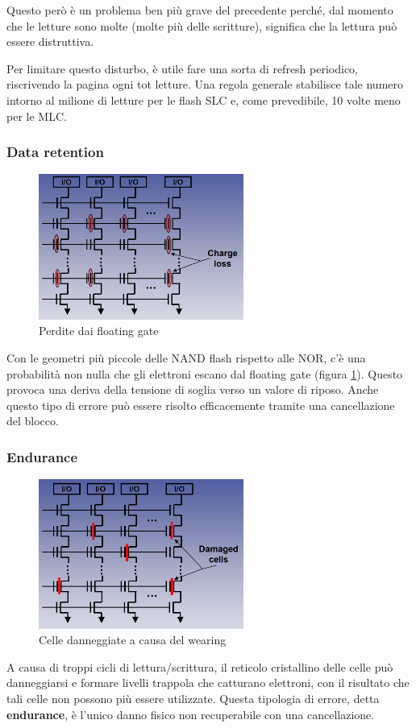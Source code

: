 \documentclass[11pt,4paper]{report}
\begin{document}
Questo però è un problema ben più grave del precedente perché, dal momento che le letture sono molte (molte più delle scritture), significa che la lettura può essere distruttiva. 

Per limitare questo disturbo, è utile fare una sorta di refresh periodico, riscrivendo la pagina ogni tot letture. Una regola generale stabilisce tale numero intorno al milione di letture per le flash SLC e, come prevedibile, 10 volte meno per le MLC.

\subsubsection{Data retention}
\begin{figure}[hbtp]
	\centering
	\includegraphics[width=0.6\textwidth]{memorie/jc_data_retention}
	\caption{Perdite dai floating gate}
	\label{fig:jc_data_retention}
\end{figure}
Con le geometri più piccole delle NAND flash rispetto alle NOR, c'è una probabilità non nulla che gli elettroni escano dal floating gate (figura \ref{fig:jc_data_retention}). Questo provoca una deriva della tensione di soglia verso un valore di riposo. Anche questo tipo di errore può essere risolto efficacemente tramite una cancellazione del blocco.

\subsubsection{Endurance}
\begin{figure}[hbtp]
	\centering
	\includegraphics[width=0.6\textwidth]{memorie/jc_endurance}
	\caption{Celle danneggiate a causa del wearing}
	\label{fig:jc_endurance}
\end{figure}
A causa di troppi cicli di lettura/scrittura, il reticolo cristallino delle celle può danneggiarsi e formare livelli trappola che catturano elettroni, con il risultato che tali celle non possono più essere utilizzate. Questa tipologia di errore, detta \textbf{endurance}, è l'unico danno fisico non recuperabile con una cancellazione. 
\end{document}

